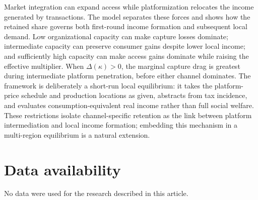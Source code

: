 \documentclass[11pt]{article}
\theoremstyle{plain}
\theoremstyle{definition}
\begin{document}
Market integration can expand access while platformization relocates the
income generated by transactions. The model separates these forces and shows
how the retained share governs both first-round income formation and subsequent
local demand. Low organizational capacity can make capture losses dominate;
intermediate capacity can preserve consumer gains despite lower local income;
and sufficiently high capacity can make access gains dominate while raising
the effective multiplier. When \(\Delta(\kappa)>0\), the marginal capture drag
is greatest during intermediate platform penetration, before either channel
dominates. The framework is deliberately a short-run local equilibrium: it
takes the platform-price schedule and production locations as given, abstracts
from tax incidence, and evaluates consumption-equivalent real income rather
than full social welfare. These restrictions isolate channel-specific retention
as the link between platform intermediation and local income formation;
embedding this mechanism in a multi-region equilibrium is a natural extension.

\section*{Data availability}

No data were used for the research described in this article.




\clearpage

\end{document}

